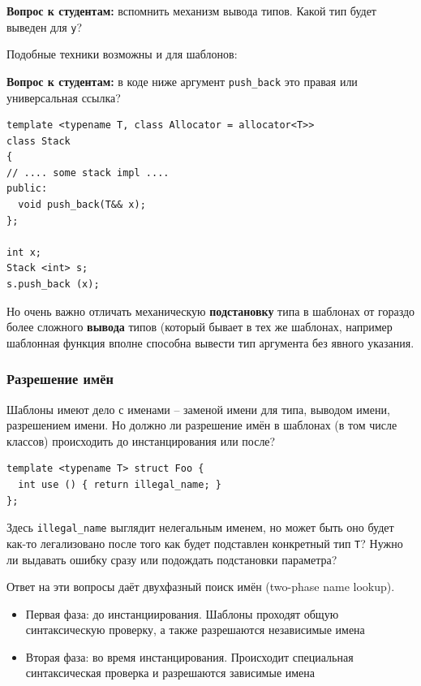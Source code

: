 \documentclass[a4paper,12pt,oneside]{article}
\newif\ifanswers
\begin{document}
\textbf{Вопрос к студентам:} вспомнить механизм вывода типов. Какой тип будет выведен для \lstinline!y!?

\ifanswers
Правильный ответ -- \lstinline!int&! так как для \lstinline!x! будет выведен тип \lstinline!int&!, а потом сработает свертывание ссылок.
\fi

Подобные техники возможны и для шаблонов:

\textbf{Вопрос к студентам:} в коде ниже аргумент \lstinline!push_back! это правая или универсальная ссылка?

\begin{lstlisting}
template <typename T, class Allocator = allocator<T>>
class Stack
{
// .... some stack impl .... 
public:
  void push_back(T&& x);
};

int x;
Stack <int> s;
s.push_back (x);
\end{lstlisting}

\ifanswers
Правильный ответ -- правая, так как вывод \lstinline!T! для вектора подставляется, а не выводится. Таким образом будет ошибка компиляции.
\fi

Но очень важно отличать механическую \textbf{подстановку} типа в шаблонах от гораздо более сложного \textbf{вывода} типов (который бывает в тех же шаблонах, например шаблонная функция вполне способна вывести тип аргумента без явного указания.

\subsubsection{Разрешение имён}

Шаблоны имеют дело с именами -- заменой имени для типа, выводом имени, разрешением имени. Но должно ли разрешение имён в шаблонах (в том числе классов) происходить до инстанцирования или после?

\begin{lstlisting}
template <typename T> struct Foo {
  int use () { return illegal_name; }
};
\end{lstlisting}

Здесь \lstinline!illegal_name! выглядит нелегальным именем, но может быть оно будет как-то легализовано после того как будет подставлен конкретный тип \lstinline!T!? Нужно ли выдавать ошибку сразу или подождать подстановки параметра?

Ответ на эти вопросы даёт двухфазный поиск имён (two-phase name lookup).

\begin{itemize}
\item
Первая фаза: до инстанциирования. Шаблоны проходят общую синтаксическую проверку, а также разрешаются независимые имена
\item
Вторая фаза: во время инстанцирования. Происходит специальная синтаксическая проверка и разрешаются зависимые имена
\end{itemize}
\end{document}
